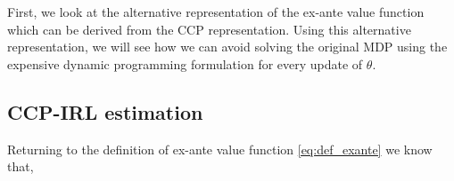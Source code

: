 \documentclass{article}
\renewcommand{\vec}[1]{\mbox{\bm{$#1$}}}
\begin{document}
First, we look at the alternative representation of the ex-ante value function which can be derived from the CCP representation.
Using this alternative representation, we will see how we can avoid solving the original MDP using the expensive dynamic programming formulation for every update of $\theta$.



\subsection{CCP-IRL estimation}

Returning to the definition of ex-ante value function \eqref{eq:def_exante} we know that,
\end{document}

